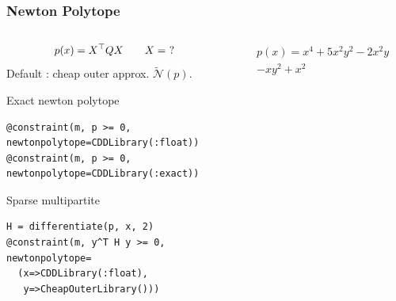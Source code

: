\documentclass{beamer}
\begin{document}
  \begin{frame}[fragile]
    \frametitle{Newton Polytope}
    \begin{columns}
      \begin{column}{0.6\textwidth}
        \[ p(x) = X^\top Q X \qquad X = \ ? \]
        Default : cheap outer approx. $\tilde{\mathcal{N}}(p)$.
        \begin{block}{Exact newton polytope}
\begin{verbatim}
@constraint(m, p >= 0,
newtonpolytope=CDDLibrary(:float))
@constraint(m, p >= 0,
newtonpolytope=CDDLibrary(:exact))
\end{verbatim}
        \end{block}
        \vspace{-1em}
        \begin{block}{Sparse multipartite}
        \vspace{-1em}
\begin{verbatim}
H = differentiate(p, x, 2)
@constraint(m, y^T H y >= 0,
newtonpolytope=
  (x=>CDDLibrary(:float),
   y=>CheapOuterLibrary()))
\end{verbatim}
        \end{block}
      \end{column}
      \begin{column}{0.4\textwidth}
        \begin{multline*}
          p(x) = x^4 + 5x^2y^2 - 2x^2y\\- xy^2 + x^2
        \end{multline*}
        \centering
        \tiny
\end{column}
\end{columns}
\end{frame}
\end{document}
